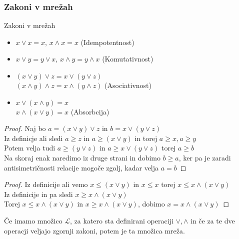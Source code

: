 \documentclass{beamer}
\begin{document}
\begin{frame}
\frametitle{Zakoni v mrežah}
\begin{block}{Zakoni v mrežah}
\begin{itemize}
\item $x \lor x = x$, $x \land x = x$ (Idempotentnost)
\item $x \lor y = y \lor x$, $x \land y = y \land x$ (Komutativnost)
\item $(x \lor y) \lor z = x \lor (y \lor z)$\\ $(x \land y) \land z = x \land (y \land z)$ (Asociativnost)
\item $ x \lor (x \land y) = x$\\ $x \land (x \lor y) = x$ (Absorbcija)
\end{itemize}
\end{block}
\end{frame}


\begin{frame}
\begin{proof}
Naj bo $a = (x \lor y) \lor z$ in $b = x \lor (y \lor z)$ \\ \pause
Iz definicje ali sledi $a \geq z$ in $a \geq (x \lor y)$ in torej $a \geq x, a \geq y$ \\ \pause
Potem velja tudi $a \geq (y \lor z)$ in $a \geq x \lor (y \lor z)$ torej $a \geq b$\\ \pause
Na skoraj enak naredimo iz druge strani in dobimo $b \geq a$, ker pa je zaradi antisimetričnosti relacije mogoče zgolj, kadar velja $a=b$
\end{proof}
\end{frame}

\begin{frame}
\begin{proof}
Iz definicije ali vemo $x \leq (x \lor y)$ in $x \leq x$ torej $x \leq x \land (x \lor y)$\\ \pause
Iz definicije in pa sledi $x \geq x \land (x \lor y)$\\ \pause
Torej $x \leq x \land (x \lor y)$ in $x \geq x \land (x \lor y)$, dobimo $x = x \land (x \lor y)$

\end{proof}
\end{frame}


\begin{frame}
\begin{theorem}
Če imamo množico $\mathcal{L}$, za katero sta definirani operaciji $\lor, \land$ in če za te dve operacji veljajo zgornji zakoni, potem je ta množica mreža.
\end{theorem}
\end{frame}
\end{document}
